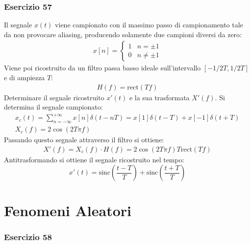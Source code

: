 \documentclass{article}
\newcommand{\rect}{\mathrm{rect}}
\newcommand{\sinc}{\mathrm{sinc}}
\begin{document}
\subsubsection*{Esercizio 57}

Il segnale $x(t)$ viene campionato con il massimo passo di campionamento tale da non provocare aliasing, producendo solamente due campioni diversi da zero:
\begin{gather*}
    x[n]=
    \begin{cases}
        1 &n=\pm1\\
        0 &n\neq\pm1
    \end{cases}
\end{gather*}
Viene poi ricostruito da un filtro passa basso ideale sull'intervallo $[-1/2T,1/2T]$ e di ampiezza $T$:
\begin{gather*}
    H(f)=\rect\displaystyle\left(Tf\right)
\end{gather*} 
Determinare il segnale ricostruito $x'(t)$ e la sua trasformata $X'(f)$. 
Si determina il segnale campionato:
\begin{gather*}
    x_c(t)=\displaystyle\sum_{n=-\infty}^{+\infty}x[n]\delta(t-nT)=x[1]\delta(t-T)+x[-1]\delta(t+T)\\
    X_c(f)=2\cos(2T\pi f)
\end{gather*}
Passando questo segnale attraverso il filtro si ottiene:
\begin{gather}
    X'(f)=X_c(f)\cdot H(f)=2\cos(2T\pi f)T\rect(Tf)
\end{gather}
Antitrasformando si ottiene il segnale ricostruito nel tempo:
\begin{equation}
    x'(t)=\displaystyle\sinc\left(\frac{t-T}{T}\right)+\sinc\left(\frac{t+T}{T}\right)
\end{equation}

\clearpage

\section{Fenomeni Aleatori}

\subsubsection*{Esercizio 58}
\end{document}
